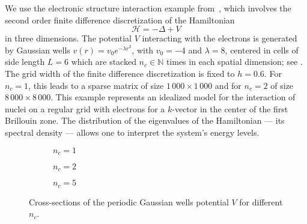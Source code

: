 We use the electronic structure interaction example from~\cite[Section 6]{lin-2017-randomized-estimation}, which involves the second order finite difference discretization of the Hamiltonian
\begin{equation}
    \mathcal{H} = - \Delta + V
    \label{equ:electronic-hamiltonian}
\end{equation}
in three dimensions. The potential $V$ interacting with the electrons is generated by Gaussian wells
    $v(r) = v_0 e^{-\lambda r^2}$, 
with $v_0 = -4$ and $\lambda = 8$, centered in cells of side length $L=6$ which are stacked $n_c \in \mathbb{N}$ times in each spatial dimension; see . The grid width of the finite difference discretization is fixed to $h=0.6$. For $n_c = 1$, this leads to a sparse matrix of size $1\,000 \times 1\,000$ and for $n_c = 2$ of size $8\,000 \times 8\,000$. This example represents an idealized model for the interaction of nuclei on a regular grid with electrons for a $k$-vector in the center of the first Brillouin zone. The distribution of the eigenvalues of the Hamiltonian --- its spectral density --- allows one to interpret the system's energy levels.


\begin{figure}[ht]
    \begin{subfigure}[b]{0.32\columnwidth}
        
        \caption{$n_c=1$}
        \label{fig:gaussian-well-1}
    \end{subfigure}
    \begin{subfigure}[b]{0.32\columnwidth}
        
        \caption{$n_c=2$}
        \label{fig:gaussian-well-2}
    \end{subfigure}
    \begin{subfigure}[b]{0.32\columnwidth}
        
        \caption{$n_c=5$}
        \label{fig:gaussian-well-5}
    \end{subfigure}
    \caption{Cross-sections of the periodic Gaussian wells potential $V$ for different $n_c$.}
    \label{fig:gaussian-well}
\end{figure}

